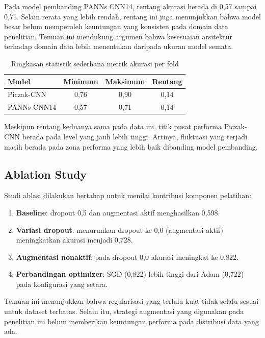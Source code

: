 \documentclass[10pt,a4paper]{jurnalvarian}
\let\LaTeXsubsection\subsection
\def\subsection{\setlength{\leftskip}{0.6cm}\LaTeXsubsection}
\begin{document}
Pada model pembanding PANNs CNN14, rentang akurasi berada di 0,57 sampai 0,71. Selain rerata yang lebih rendah, rentang ini juga menunjukkan bahwa model besar belum memperoleh keuntungan yang konsisten pada domain data penelitian. Temuan ini mendukung argumen bahwa kesesuaian arsitektur terhadap domain data lebih menentukan daripada ukuran model semata.

\begin{table}[H]
\centering
\fontsize{8pt}{10pt}\selectfont
\caption{Ringkasan statistik sederhana metrik akurasi per fold}
\begin{tabular}{lccc}
\hline
Model & Minimum & Maksimum & Rentang \\
\hline
Piczak-CNN & 0,76 & 0,90 & 0,14 \\
PANNs CNN14 & 0,57 & 0,71 & 0,14 \\
\hline
\end{tabular}
\end{table}

Meskipun rentang keduanya sama pada data ini, titik pusat performa Piczak-CNN berada pada level yang jauh lebih tinggi. Artinya, fluktuasi yang terjadi masih berada pada zona performa yang lebih baik dibanding model pembanding.

\subsection{Ablation Study}
Studi ablasi dilakukan bertahap untuk menilai kontribusi komponen pelatihan:
\begin{enumerate}[leftmargin=1.25cm]
\item \textbf{Baseline}: dropout 0,5 dan augmentasi aktif menghasilkan 0,598.
\item \textbf{Variasi dropout}: menurunkan dropout ke 0,0 (augmentasi aktif) meningkatkan akurasi menjadi 0,728.
\item \textbf{Augmentasi nonaktif}: pada dropout 0,0 akurasi meningkat ke 0,822.
\item \textbf{Perbandingan optimizer}: SGD (0,822) lebih tinggi dari Adam (0,722) pada konfigurasi yang setara.
\end{enumerate}

Temuan ini menunjukkan bahwa regularisasi yang terlalu kuat tidak selalu sesuai untuk dataset terbatas. Selain itu, strategi augmentasi yang digunakan pada penelitian ini belum memberikan keuntungan performa pada distribusi data yang ada.
\end{document}

